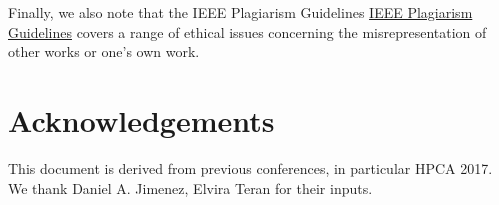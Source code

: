\documentclass{sig-alternate}
\begin{document}
Finally, we also note that the IEEE Plagiarism Guidelines \href{http://www.ieee.org/publications\_standards/publications/rights/plagiarism.html}{IEEE Plagiarism Guidelines} covers a range of ethical issues concerning the misrepresentation of other works or
one's own work.

\section{Acknowledgements}
This document is derived from previous conferences, in particular HPCA 2017.  We thank Daniel A. Jimenez,  Elvira Teran for their inputs.






\end{document}

